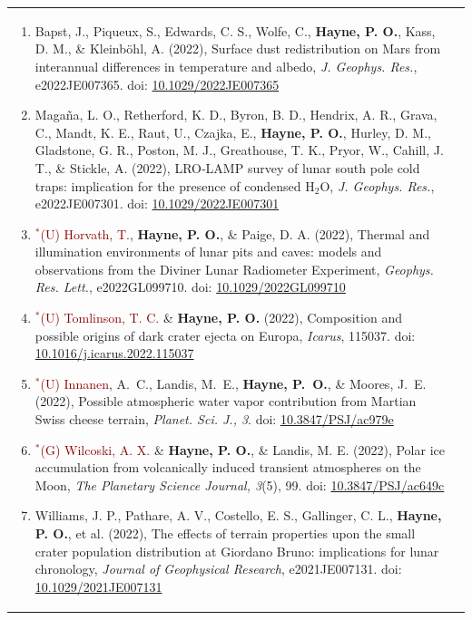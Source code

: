 \documentclass[letterpaper,10pt,twoside]{article}
\begin{document}
\begin{longtable}{@{} p{} p{}}
\begin{enumerate}[leftmargin=!,labelindent=2.5pt,itemindent=-10pt]
{            }
            \item{\small Bapst, J., Piqueux, S., Edwards, C. S., Wolfe, C., \textbf{Hayne, P. O.}, Kass, D. M., \& Kleinb\"ohl, A. (2022), Surface dust redistribution on Mars from interannual differences in temperature and albedo, {\it J. Geophys. Res.}, e2022JE007365. doi: \href{https://doi.org/10.1029/2022JE007365}{10.1029/2022JE007365}
            }
            \item{\small Maga\~{n}a, L. O., Retherford, K. D., Byron, B. D., Hendrix, A. R., Grava, C., Mandt, K. E., Raut, U., Czajka, E., \textbf{Hayne, P. O.}, Hurley, D. M., Gladstone, G. R., Poston, M. J., Greathouse, T. K., Pryor, W., Cahill, J. T., \& Stickle, A. (2022), LRO‐LAMP survey of lunar south pole cold traps: implication for the presence of condensed H$_2$O, {\it J. Geophys. Res.}, e2022JE007301. doi: \href{https://doi.org/10.1029/2022JE007301}{10.1029/2022JE007301}
            }
            \item{\small \textcolor{darkred}{$^*$(U) Horvath, T.}, \textbf{Hayne, P. O.}, \& Paige, D. A. (2022), Thermal and illumination environments of lunar pits and caves: models and observations from the Diviner Lunar Radiometer Experiment, {\it Geophys. Res. Lett.}, e2022GL099710. doi: \href{https://doi.org/10.1029/2022GL099710}{10.1029/2022GL099710}
            }               
            \item{\small \textcolor{darkred}{$^*$(U) Tomlinson, T. C.} \& \textbf{Hayne, P. O.} (2022), Composition and possible origins of dark crater ejecta on Europa, {\it Icarus}, 115037. doi: \href{https://doi.org/10.1016/j.icarus.2022.115037}{10.1016/j.icarus.2022.115037}
            }            
            \item{\small \textcolor{darkred}{$^*$(U) Innanen}, A.~C., Landis, M.~E., \textbf{Hayne, P.~O.}, \& Moores, J.~E. (2022), Possible atmospheric water vapor contribution from Martian Swiss cheese terrain, {\it Planet. Sci. J., 3}. doi: \href{https://doi.org/10.3847/PSJ/ac979e}{10.3847/PSJ/ac979e}
            }
            \item{\small \textcolor{darkred}{$^*$(G) Wilcoski, A. X.} \& \textbf{Hayne, P. O.}, \& Landis, M. E. (2022), Polar ice accumulation from volcanically induced transient atmospheres on the Moon, {\it The Planetary Science Journal, 3}(5), 99. doi: \href{https://doi.org/10.3847/PSJ/ac649c}{10.3847/PSJ/ac649c}
            }             
            \item{\small Williams, J. P., Pathare, A. V., Costello, E. S., Gallinger, C. L., \textbf{Hayne, P. O.}, et al. (2022), The effects of terrain properties upon the small crater population distribution at Giordano Bruno: implications for lunar chronology, {\it Journal of Geophysical Research}, e2021JE007131. doi: \href{https://doi.org/10.1029/2021JE007131}{10.1029/2021JE007131}
}
\end{enumerate}
\end{longtable}
\end{document}

